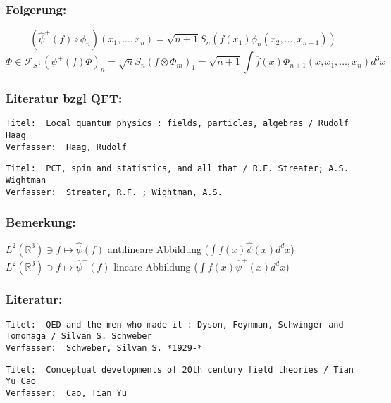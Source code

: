 \documentclass[twoside,a4paper]{scrartcl}
\newcommand{\R}{\mathbb{R}}
\renewcommand{\1}{\mathds{1}}
\newcommand{\F}{\mathcal{F}}
\renewcommand{\R}{\mathbb{R}}
\begin{document}
\subsubsection*{Folgerung:}
$$(\hat \psi^+(f)\circ \phi_n)(x_1,...,x_n)=\sqrt{n+1} S_n (f(x_1) \phi_n(x_2,...,x_{n+1}))$$
$$\Phi \in \F_S: (\psi^+(f)\Phi)_n=\sqrt{n} S_n(f \otimes \Phi_m)_1=\sqrt{n+1}\int \overline{f}(x)\Phi_{n+1}(x,x_1,...,x_n)d^3x $$
\subsubsection*{Literatur bzgl QFT:}
\begin{tiny}
\begin{verbatim}
Titel: 	Local quantum physics : fields, particles, algebras / Rudolf Haag
Verfasser: 	Haag, Rudolf
\end{verbatim}
\end{tiny}

\begin{tiny}
\begin{verbatim}
Titel: 	PCT, spin and statistics, and all that / R.F. Streater; A.S. Wightman
Verfasser: 	Streater, R.F. ; Wightman, A.S.
\end{verbatim}
\end{tiny}

\subsubsection*{Bemerkung:}
$L^2(\R^3) \ni f \mapsto \hat \psi(f)$ antilineare Abbildung ($\int \overline{f}(x)\hat \psi(x)d^dx$)\\
$L^2(\R^3) \ni f \mapsto \hat \psi^+(f)$ lineare Abbildung ($\int {f}(x)\hat \psi^+(x)d^dx$)\\

\subsubsection*{Literatur:}
\begin{tiny}
\begin{verbatim}
Titel: 	QED and the men who made it : Dyson, Feynman, Schwinger and Tomonaga / Silvan S. Schweber
Verfasser: 	Schweber, Silvan S. *1929-*
\end{verbatim}
\end{tiny}


\begin{tiny}
\begin{verbatim}
Titel: 	Conceptual developments of 20th century field theories / Tian Yu Cao
Verfasser: 	Cao, Tian Yu
\end{verbatim}
\end{tiny}
\end{document}
